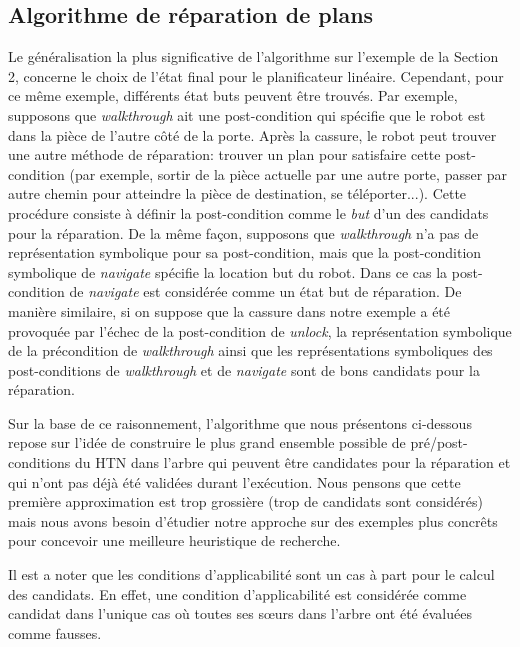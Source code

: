 \documentclass[a4paper,twoside,french]{article}
\begin{document}
			\subsection{Algorithme de réparation de plans}
			\noindent Le généralisation la plus significative de l'algorithme sur l'exemple de la Section 2, concerne le choix de l'état final pour le planificateur linéaire. Cependant, pour ce même exemple, différents état buts peuvent être trouvés. Par exemple, supposons que {\em walkthrough} ait une post-condition qui spécifie que le robot est dans la pièce de l'autre côté de la porte. Après la cassure, le robot peut trouver une autre méthode de réparation: trouver un plan pour satisfaire cette post-condition (par exemple, sortir de la pièce actuelle par une autre porte, passer par autre chemin pour atteindre la pièce de destination, se téléporter...). Cette procédure consiste à définir la post-condition comme le {\em but} d'un des candidats pour la réparation. De la même façon, supposons que {\em walkthrough} n'a pas de représentation symbolique pour sa post-condition, mais que la post-condition symbolique de {\em navigate} spécifie la location but du robot. Dans ce cas la post-condition de {\em navigate} est considérée comme un état but de réparation. De manière similaire, si on suppose que la cassure dans notre exemple a été provoquée par l'échec de la post-condition de {\em unlock}, la représentation symbolique de la précondition de {\em walkthrough} ainsi que les représentations symboliques des post-conditions de {\em walkthrough} et de {\em navigate} sont de bons candidats pour la réparation.
		\par Sur la base de ce raisonnement, l'algorithme que nous présentons ci-dessous repose sur l'idée de construire le plus grand ensemble possible de pré/post-conditions du HTN dans l'arbre qui peuvent être candidates pour la réparation et qui n'ont pas déjà été validées durant l'exécution. Nous pensons que cette première approximation est trop grossière (trop de candidats sont considérés) mais nous avons besoin d'étudier notre approche sur des exemples plus concrêts pour concevoir une meilleure heuristique de recherche.

Il est a noter que les conditions d'applicabilité sont un cas à part pour le calcul des candidats. En effet, une condition d'applicabilité est considérée comme candidat dans l'unique cas où toutes ses s\oe urs dans l'arbre ont été évaluées comme fausses.
\end{document}
